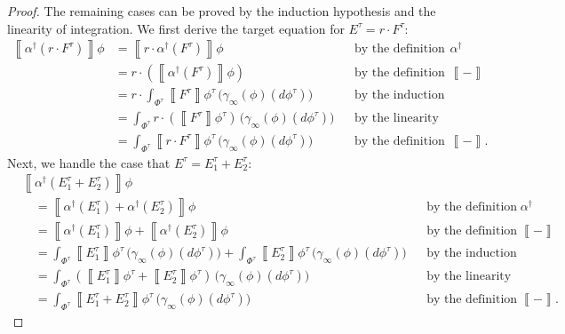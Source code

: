 \documentclass{article}
\newcommand*{\db}[1]{\left\llbracket #1 \right\rrbracket}
\begin{document}
\begin{proof}
  The remaining cases can be proved by the induction hypothesis and the linearity of integration. We first derive the target equation for $E^\tau = r \cdot F^\tau$:
  \begin{align*}
    \db{\alpha^\dagger(r \cdot F^\tau)}\phi 
    & = \db{r \cdot \alpha^\dagger(F^\tau)}\phi
    && \text{by the definition of } \alpha^\dagger
    \\
    & = r \cdot \left(\db{\alpha^\dagger(F^\tau)}\phi\right)
    && \text{by the definition of } \db{-}
    \\
    & = r \cdot \int_{\Phi^\tau} \db{F^\tau}\phi^\tau \, \Big(\gamma_\infty(\phi)(d\phi^\tau)\Big)
    && \text{by the induction hypothesis}
    \\
    & = \int_{\Phi^\tau} r \cdot \left(\db{F^\tau}\phi^\tau\right) \, \Big(\gamma_\infty(\phi)(d\phi^\tau)\Big)
    && \text{by the linearity of integration}
    \\
    & = \int_{\Phi^\tau} \db{r \cdot F^\tau}\phi^\tau \, \Big(\gamma_\infty(\phi)(d\phi^\tau)\Big)
    && \text{by the definition of } \db{-}.
  \end{align*}
  Next, we handle the case that $E^\tau = E_1^\tau + E_2^\tau$:
  \begin{align*}
    & \db{\alpha^\dagger(E_1^\tau + E_2^\tau)}\phi 
    \\
    & \quad {} = \db{\alpha^\dagger(E_1^\tau) + \alpha^\dagger(E_2^\tau)}\phi
    && \text{by the definition of } \alpha^\dagger
    \\
    & \quad {} = \db{\alpha^\dagger(E_1^\tau)}\phi + \db{\alpha^\dagger(E_2^\tau)}\phi
    && \text{by the definition of } \db{-}
    \\
    & \quad {} = \int_{\Phi^\tau} \db{E_1^\tau}\phi^\tau \, \Big(\gamma_\infty(\phi)(d\phi^\tau)\Big)
    + \int_{\Phi^\tau} \db{E_2^\tau}\phi^\tau \, \Big(\gamma_\infty(\phi)(d\phi^\tau)\Big)
    && \text{by the induction hypothesis}
    \\
    & \quad {} = \int_{\Phi^\tau} \left(\db{E_1^\tau}\phi^\tau + \db{E_2^\tau}\phi^\tau\right) \, \Big(\gamma_\infty(\phi)(d\phi^\tau)\Big)
    && \text{by the linearity of integration}
    \\
    & \quad {} = \int_{\Phi^\tau} \db{E_1^\tau + E_2^\tau}\phi^\tau \, \Big(\gamma_\infty(\phi)(d\phi^\tau)\Big)
    && \text{by the definition of } \db{-}.     
  \end{align*}
\end{proof}
\end{document}

